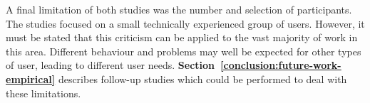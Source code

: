 A final limitation of both studies was the number and selection of participants. The studies focused on a small technically experienced group of users.  However, it must be stated that this criticism can be applied to the vast majority of work in this area.   Different behaviour and problems may well be expected for other types of user, leading to different user needs.  
\textbf{Section~\ref{conclusion:future-work-empirical}} describes follow-up studies which could be performed to deal with these limitations.

